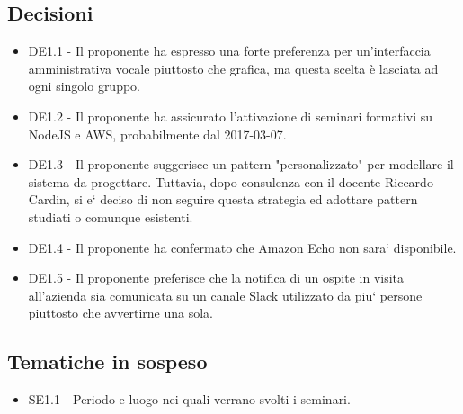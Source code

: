 \documentclass[a4paper,titlepage]{article}
\begin{document}
 \subsection{Decisioni}
 \begin{itemize}
  \item DE1.1 - Il proponente ha espresso una forte preferenza per un'interfaccia amministrativa vocale piuttosto che grafica, ma questa scelta è lasciata ad ogni singolo gruppo. 
  \item DE1.2 - Il proponente ha assicurato l'attivazione di seminari formativi su NodeJS e AWS, probabilmente dal 2017-03-07.
  \item DE1.3 - Il proponente suggerisce un pattern "personalizzato" per modellare il sistema da progettare. Tuttavia, dopo consulenza con il docente Riccardo Cardin, si e` deciso di non seguire questa strategia ed adottare pattern studiati o comunque esistenti.
  \item DE1.4 - Il proponente ha confermato che Amazon Echo non sara` disponibile.
  \item DE1.5 - Il proponente preferisce che la notifica di un ospite in visita all'azienda sia comunicata su un canale Slack utilizzato da piu` persone piuttosto che avvertirne una sola.
 \end{itemize}

\subsection{Tematiche in sospeso}
  \begin{itemize}
  \item SE1.1 - Periodo e luogo nei quali verrano svolti i seminari.
  \end{itemize}
\end{document}
